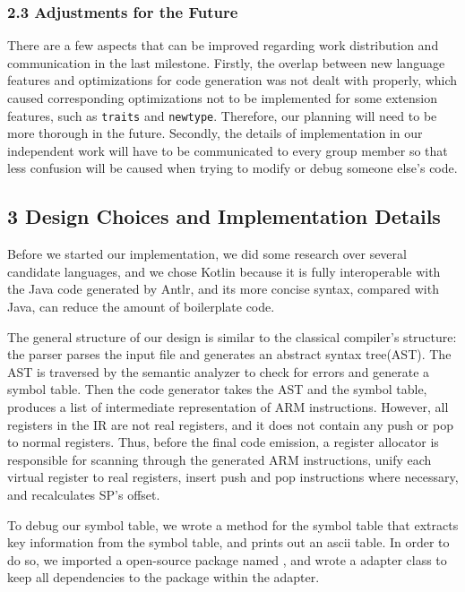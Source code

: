 \documentclass[10pt,a4paper,]{report}
\begin{document}
  \subsubsection*{2.3 Adjustments for the Future}
  There are a few aspects that can be improved regarding work distribution and
  communication in the last milestone. Firstly, the overlap between new language
  features and optimizations for code generation was not dealt with properly,
  which caused corresponding optimizations not to be implemented for some
  extension features, such as \texttt{traits} and \texttt{newtype}. Therefore, our
  planning will need to be more thorough in the future. Secondly, the details of
  implementation in our independent work will have to be communicated to every
  group member so that less confusion will be caused when trying to modify or
  debug someone else’s code.

  \subsection*{3 Design Choices and Implementation Details}
  Before we started our implementation, we did some research over several
  candidate languages, and we chose Kotlin because it is fully interoperable
  with the Java code generated by Antlr, and its more concise syntax, compared
  with Java, can reduce the amount of boilerplate code.

  The general structure of our design is similar to the classical compiler's
  structure: the parser parses the input file and generates an abstract syntax
  tree(AST). The AST is traversed by the semantic analyzer to check for errors
  and generate a symbol table. Then the code generator takes the AST and the
  symbol table, produces a list of intermediate representation of ARM
  instructions. However, all registers in the IR are not real registers, and it
  does not contain any push or pop to normal registers. Thus, before the final
  code emission, a register allocator is responsible for scanning through the
  generated ARM instructions, unify each virtual register to real registers,
  insert push and pop instructions where necessary, and recalculates SP's offset.

  To debug our symbol table, we wrote a  method for the symbol
  table that extracts key information from the symbol table, and prints out an
  ascii table. In order to do so, we imported a open-source package named
  , and wrote a adapter class 
  to keep all dependencies to the package within the adapter.
\end{document}
